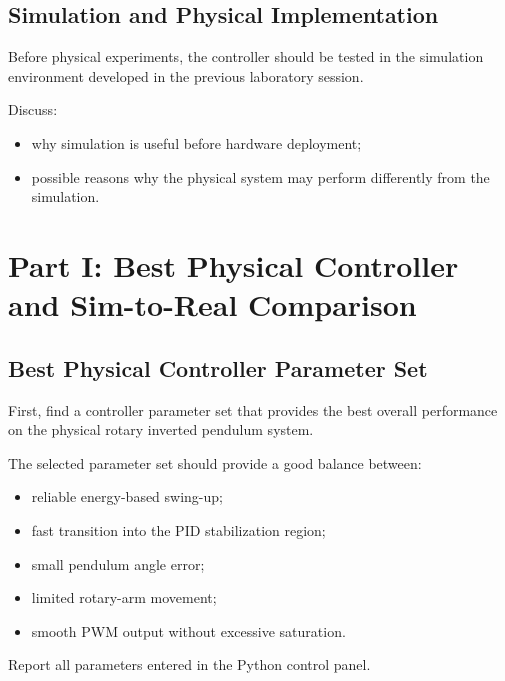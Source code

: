 \documentclass[11pt,a4paper]{article}
\begin{document}

\subsection{Simulation and Physical Implementation}

Before physical experiments, the controller should be tested in the simulation
environment developed in the previous laboratory session.

Discuss:

\begin{itemize}
    \item why simulation is useful before hardware deployment;
    \item possible reasons why the physical system may perform differently from the simulation.
\end{itemize}



\section{Part I: Best Physical Controller and Sim-to-Real Comparison}
\label{sec:part1}

\subsection{Best Physical Controller Parameter Set}

First, find a controller parameter set that provides the best overall
performance on the physical rotary inverted pendulum system.

The selected parameter set should provide a good balance between:

\begin{itemize}
    \item reliable energy-based swing-up;
    \item fast transition into the PID stabilization region;
    \item small pendulum angle error;
    \item limited rotary-arm movement;
    \item smooth PWM output without excessive saturation.
\end{itemize}

Report all parameters entered in the Python control panel.
\end{document}
